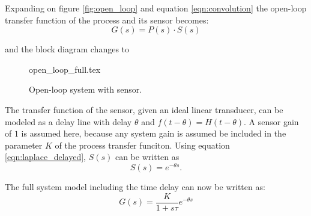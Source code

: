 Expanding on figure \ref{fig:open_loop} and equation \ref{eqn:convolution} the open-loop transfer function of the process and its sensor becomes:
\begin{equation}
    G(s) = P(s) \cdot S(s)
\end{equation}

and the block diagram changes to
\begin{figure}[ht]
    \centering
        {open_loop_full.tex}
    \caption{Open-loop system with sensor.}
\end{figure}

The transfer function of the sensor, given an ideal linear transducer, can be modeled as a delay line with delay $\theta$ and $f(t-\theta) = H(t-\theta)$. A sensor gain of $1$ is assumed here, because any system gain is assumed be included in the parameter $K$ of the process transfer funciton. Using equation \ref{eqn:laplace_delayed}, $S(s)$ can be written as
\begin{equation}
    S(s) = e^{-\theta s} .
\end{equation}

The full system model including the time delay can now be written as:
\begin{equation}
    G(s) = \frac{K}{1 + s\tau} e^{-\theta s} \label{eqn:first-order_plus_dead_time_model}
\end{equation}

